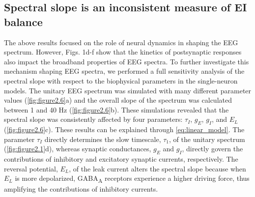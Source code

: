 \subsection{Spectral slope is an inconsistent measure of EI balance}
The above results focused on the role of neural dynamics in shaping the EEG spectrum. However, Figs. 1d-f show that the kinetics of postsynaptic responses also impact the broadband properties of EEG spectra. To further investigate this mechanism shaping EEG spectra, we performed a full sensitivity analysis of the spectral slope with respect to the biophysical parameters in the single-neuron models. The unitary EEG spectrum was simulated with many different parameter values (\autoref{fig:figure2.6}a) and the overall slope of the spectrum was calculated \cite{Donoghue2020} between 1 and 40 \unit{\hertz} (\autoref{fig:figure2.6}b). These simulations revealed that the spectral slope was consistently affected by four parameters: $\tau_I$, $g_E$, $g_I$, and $E_L$ (\autoref{fig:figure2.6}c). These results can be explained through \ref{eq:linear_model}. The parameter $\tau_I$ directly determines the slow timescale, $\tau_1$, of the unitary spectrum (\autoref{fig:figure2.1}d), whereas synaptic conductances, $g_E$ and $g_I$, directly govern the contributions of inhibitory and excitatory synaptic currents, respectively. The reversal potential, $E_L$, of the leak current alters the spectral slope because when $E_L$ is more depolarized, GABA\textsubscript{A} receptors experience a higher driving force, thus amplifying the contributions of inhibitory currents. 


